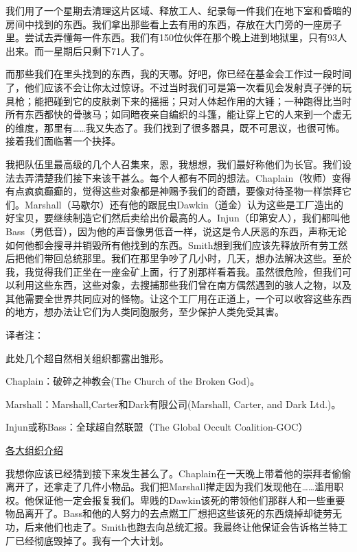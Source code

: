 \documentclass[openany,a4paper]{book} %
\begin{document}
我们用了一个星期去清理这片区域、释放工人、纪录每一件我们在地下室和昏暗的房间中找到的东西。我们拿出那些看上去有用的东西，存放在大门旁的一座房子里。尝试去弄懂每一件东西。我们有150位伙伴在那个晚上进到地狱里，只有93人出来。而一星期后只剩下71人了。\vspace{12pt}

而那些我们在里头找到的东西，我的天哪。好吧，你已经在基金会工作过一段时间了，他们应该不会让你太过惊讶。不过当时我们可是第一次看见会发射真子弹的玩具枪；能把碰到它的皮肤剥下来的摇摇；只对人体起作用的大锤；一种跑得比当时所有东西都快的骨骇马；如同暗夜亲自编织的斗篷，能让穿上它的人来到一个虚无的维度，那里有……我又失态了。我们找到了很多器具，既不可思议，也很可怖。接着我们面临著一个抉择。\vspace{12pt}

我把队伍里最高级的几个人召集来，恩，我想想，我们最好称他们为长官。我们设法去弄清楚我们接下来该干甚么。每个人都有不同的想法。Chaplain（牧师）变得有点疯疯癫癫的，觉得这些对象都是神赐予我们的奇蹟，要像对待圣物一样崇拜它们。Marshall（马歇尔）还有他的跟屁虫Dawkin（道金）认为这些是工厂造出的好宝贝，要继续制造它们然后卖给出价最高的人。Injun（印第安人），我们都叫他Bass（男低音），因为他的声音像男低音一样，说这是令人厌恶的东西，声称无论如何他都会搜寻并销毁所有他找到的东西。Smith想到我们应该先释放所有劳工然后把他们带回总统那里。我们在那里争吵了几小时，几天，想办法解决这些。至於我，我觉得我们正坐在一座金矿上面，行了別那样看着我。虽然很危险，但我们可以利用这些东西，这些对象，去搜捕那些我们曾在南方偶然遇到的骇人之物，以及其他需要全世界共同应对的怪物。让这个工厂用在正道上，一个可以收容这些东西的地方，想办法让它们为人类同胞服务，至少保护人类免受其害。\vspace{12pt}

译者注：

\begin{colorboxed}
此处几个超自然相关组织都露出雏形。

Chaplain：破碎之神教会(The Church of the Broken God)。

Marshall：Marshall,Carter和Dark有限公司(Marshall, Carter, and Dark Ltd.)。

Injun或称Bass：全球超自然联盟（The Global Occult Coalition-GOC）

\hyperref[chap:各大组织介绍]{各大组织介绍}
\end{colorboxed}\vspace{12pt}

我想你应该已经猜到接下来发生甚么了。Chaplain在一天晚上带着他的崇拜者偷偷离开了，还拿走了几件小物品。我们把Marshall撵走因为我们发现他在……滥用职权。他保证他一定会报复我们。卑贱的Dawkin该死的带领他们那群人和一些重要物品离开了。Bass和他的人努力的去点燃工厂想把这些该死的东西烧掉却徒劳无功，后来他们也走了。Smith也跑去向总统汇报。我最终让他保证会告诉格兰特工厂已经彻底毁掉了。我有一个大计划。\vspace{12pt}
\end{document}
